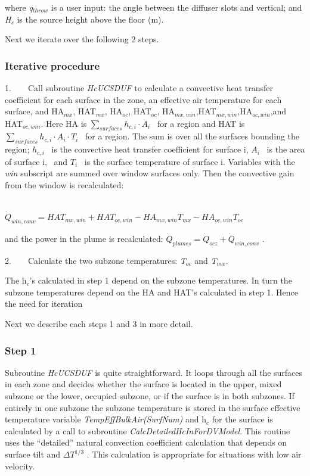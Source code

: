 where \emph{q\(_{throw}\)} is a user input: the angle between the diffuser slots and vertical; and \emph{H\(_{s}\)} is the source height above the floor (m).

Next we iterate over the following 2 steps.

\subsubsection{Iterative procedure}\label{iterative-procedure-2}

1.~~~~Call subroutine \emph{HcUCSDUF} to calculate a convective heat transfer coefficient for each surface in the zone, an effective air temperature for each surface, and HA\(_{mx}\), HAT\(_{mx}\), HA\(_{oc}\), HAT\(_{oc}\), HA\(_{mx,win}\),HAT\(_{mx,win}\),HA\(_{oc,win}\),and HAT\(_{oc,win}\). Here HA is \(\sum\limits_{surfaces} {{h_{c,i}} \cdot {A_i}}\) ~for a region and HAT is \(\sum\limits_{surfaces} {{h_{c,i}} \cdot {A_i}} \cdot {T_i}\) ~for a region. The sum is over all the surfaces bounding the region; \({h_{c,i}}\) ~is the convective heat transfer coefficient for surface i, \({A_i}\) ~is the area of surface i,~ and \({T_i}\) ~is the surface temperature of surface i. Variables with the \emph{win} subscript are summed over window surfaces only. Then the convective gain from the window is recalculated:

~~~~~~~~~~~~~~~~~~~~~~~~~~~~~ \({\dot Q_{win,conv}} = HA{T_{mx,win}} + HA{T_{oc,win}} - H{A_{mx,win}}{T_{mx}} - H{A_{oc,win}}{T_{oc}}\)

and the power in the plume is recalculated: \({\dot Q_{plumes}} = {\dot Q_{ocz}} + {\dot Q_{win,conv}}\) .

2.~~~~Calculate the two subzone temperatures: \emph{T\(_{oc}\)} and \emph{T\(_{mx}\)}.

The h\(_{c}\)'s calculated in step 1 depend on the subzone temperatures. In turn the subzone temperatures depend on the HA and HAT's calculated in step 1. Hence the need for iteration

Next we describe each steps 1 and 3 in more detail.

\subsubsection{Step 1}\label{step-1-2}

Subroutine \emph{HcUCSDUF} is quite straightforward. It loops through all the surfaces in each zone and decides whether the surface is located in the upper, mixed subzone or the lower, occupied subzone, or if the surface is in both subzones. If entirely in one subzone the subzone temperature is stored in the surface effective temperature variable \emph{TempEffBulkAir(SurfNum)} and h\(_{c}\) for the surface is calculated by a call to subroutine \emph{CalcDetailedHcInForDVModel}. This routine uses the ``detailed'' natural convection coefficient calculation that depends on surface tilt and \(\Delta {T^{1/3}}\) . This calculation is appropriate for situations with low air velocity.

